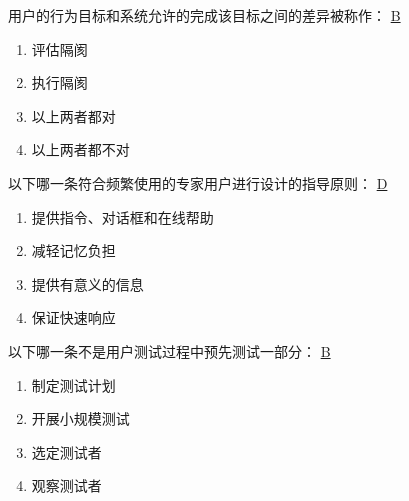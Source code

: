 \begin{problem}
	‍用户的行为目标和系统允许的完成该目标之间的差异被称作：
	\uline{B}    
    \vspace{-0.8em}
    \begin{multicols}{4}
        \begin{enumerate}[label=\Alph*.]
            \item 评估隔阂
            \item 执行隔阂
            \item 以上两者都对
            \item 以上两者都不对
        \end{enumerate}
    \end{multicols}
    \vspace{-1em}
\end{problem}



\begin{problem}
	‍以下哪一条符合频繁使用的专家用户进行设计的指导原则：
	\uline{D}    
    \vspace{-0.8em}
    \begin{multicols}{2}
        \begin{enumerate}[label=\Alph*.]
            \item 提供指令、对话框和在线帮助
            \item 减轻记忆负担
            \item 提供有意义的信息
            \item 保证快速响应
        \end{enumerate}
    \end{multicols}
    \vspace{-1em}
\end{problem}



\begin{problem}
	‍以下哪一条不是用户测试过程中预先测试一部分：
	\uline{B}    
    \vspace{-0.8em}
    \begin{multicols}{4}
        \begin{enumerate}[label=\Alph*.]
            \item 制定测试计划
            \item 开展小规模测试
            \item 选定测试者
            \item 观察测试者
        \end{enumerate}
    \end{multicols}
    \vspace{-1em}
\end{problem}




